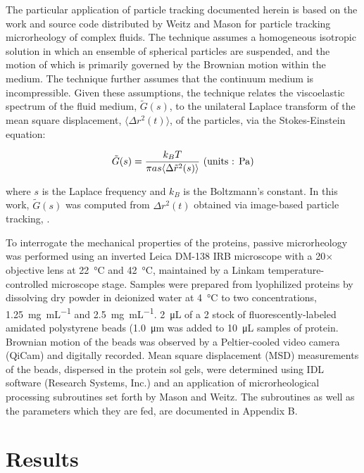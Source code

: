 \begin{refsection}
The particular application of particle tracking documented herein is based on
the work and source code distributed by Weitz and Mason for particle tracking
microrheology of complex fluids.\cite{Mason1997} The technique assumes a
homogeneous isotropic solution in which an ensemble of spherical particles are
suspended, and the motion of which is primarily governed by the Brownian motion
within the medium.  The technique further assumes that the continuum medium is
incompressible. Given these assumptions, the technique relates the viscoelastic
spectrum of the fluid medium, ${\tilde{G}(s)}$, to the unilateral Laplace
transform of the mean square displacement, ${\langle \Delta r^2(t) \rangle}$, of
the particles, via the Stokes-Einstein equation:

\begin{equation}
    \label{eq:stokes-einstein}
    \tilde{G}(s)=
    \frac{k_BT}{\pi a s \langle \Delta \tilde{r}^2(s) \rangle}
    \text{ (units : \si{\pascal})}
\end{equation}

where ${s}$ is the Laplace frequency and ${k_B}$ is the Boltzmann's constant. In
this work, ${\tilde{G}(s)}$ was computed from ${\Delta r^2(t)}$ obtained via
image-based particle tracking, .

To interrogate the mechanical properties of the proteins, passive microrheology
was performed using an inverted Leica DM-138 IRB microscope with a 20$\times$
objective lens at \SI{22}{\celsius} and \SI{42}{\celsius}, maintained by a
Linkam temperature-controlled microscope stage. Samples were prepared from
lyophilized proteins by dissolving dry powder in deionized water at
\SI{4}{\celsius} to two concentrations, \SI{1.25}{\mg\per\mL} and
\SI{2.5}{\mg\per\mL}. \SI{2}{\uL} of a \SI{2}{\wtper} stock of
fluorescently-labeled amidated polystyrene beads (\SI{1.0}{\um} was added to
\SI{10}{\uL} samples of protein. Brownian motion of the beads was observed by a
Peltier-cooled video camera (QiCam) and digitally recorded.  Mean square
displacement (MSD) measurements of the beads, dispersed in the protein sol gels,
were determined using IDL software (Research Systems, Inc.) and an application
of microrheological processing subroutines set forth by Mason and
Weitz.\cite{Mason1997} The subroutines as well as the parameters which they are
fed, are documented in Appendix B. 

\section{Results}


\end{refsection}
